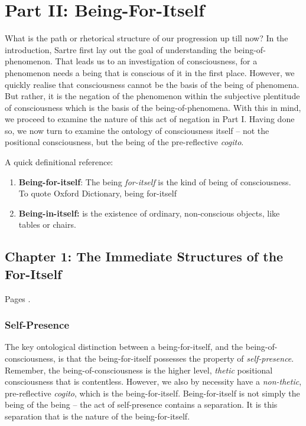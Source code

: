 \chapter{Part II: Being-For-Itself}

\textsf{What is the path or rhetorical structure of our progression up till now? In the introduction, Sartre first lay out the goal of understanding the being-of-phenomenon. That leads us to an investigation of consciousness, for a phenomenon needs a being that is conscious of it in the first place. However, we quickly realise that consciousness cannot be the basis of the being of phenomena. But rather, it is the negation of the phenomenon within the subjective plentitude of consciousness which is the basis of the being-of-phenomena. With this in mind, we proceed to examine the nature of this act of negation in Part I. Having done so, we now turn to examine the ontology of consciousness itself -- not the positional consciousness, but the being of the pre-reflective \emph{cogito}.}

\noindent
A quick definitional reference:

\begin{enumerate}
  \item \textbf{Being-for-itself}: The being \emph{for-itself} is the kind of being of consciousness. To quote Oxford Dictionary, being for-itself 
  \item \textbf{Being-in-itself:} is the existence of ordinary, non-conscious objects, like tables or chairs.
\end{enumerate}

\section{Chapter 1: The Immediate Structures of the For-Itself}

Pages \autocite[121 -- 162]{sartre}.

\subsection{Self-Presence}

The key ontological distinction between a being-for-itself, and the being-of-consciousness, is that the being-for-itself possesses the property of \emph{self-presence}. Remember, the being-of-consciousness is the higher level, \emph{thetic} positional consciousness that is contentless. However, we also by necessity have a \emph{non-thetic}, pre-reflective \emph{cogito}, which is the being-for-itself. Being-for-itself is not simply the being of the being -- the act of self-presence contains a separation. It is this separation that is the nature of the being-for-itself.

